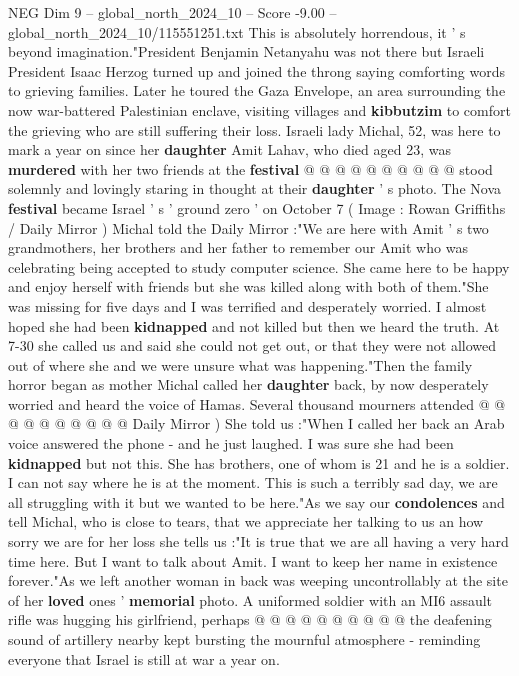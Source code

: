 \begin{textsample}{NEG Dim 9 – global\_north\_2024\_10 – Score -9.00 – global\_north\_2024\_10/115551251.txt}
This is absolutely horrendous, it ' s beyond imagination."President Benjamin Netanyahu was not there but Israeli President Isaac Herzog turned up and joined the throng saying comforting words to grieving families.
Later he toured the Gaza Envelope, an area surrounding the now war-battered Palestinian enclave, visiting villages and \textbf{kibbutzim} to comfort the grieving who are still suffering their loss.
Israeli lady Michal, 52, was here to mark a year on since her \textbf{daughter} Amit Lahav, who died aged 23, was \textbf{murdered} with her two friends at the \textbf{festival} @ @ @ @ @ @ @ @ @ @ stood solemnly and lovingly staring in thought at their \textbf{daughter} ' s photo.
The Nova \textbf{festival} became Israel ' s ' ground zero ' on October 7 ( Image : Rowan Griffiths / Daily Mirror ) Michal told the Daily Mirror :"We are here with Amit ' s two grandmothers, her brothers and her father to remember our Amit who was celebrating being accepted to study computer science.
She came here to be happy and enjoy herself with friends but she was killed along with both of them."She was missing for five days and I was terrified and desperately worried.
I almost hoped she had been \textbf{kidnapped} and not killed but then we heard the truth.
At 7-30 she called us and said she could not get out, or that they were not allowed out of where she and we were unsure what was happening."Then the family horror began as mother Michal called her \textbf{daughter} back, by now desperately worried and heard the voice of Hamas.
Several thousand mourners attended @ @ @ @ @ @ @ @ @ @ Daily Mirror ) She told us :"When I called her back an Arab voice answered the phone - and he just laughed.
I was sure she had been \textbf{kidnapped} but not this.
She has brothers, one of whom is 21 and he is a soldier.
I can not say where he is at the moment.
This is such a terribly sad day, we are all struggling with it but we wanted to be here."As we say our \textbf{condolences} and tell Michal, who is close to tears, that we appreciate her talking to us an how sorry we are for her loss she tells us :"It is true that we are all having a very hard time here.
But I want to talk about Amit.
I want to keep her name in existence forever."As we left another woman in back was weeping uncontrollably at the site of her \textbf{loved} ones ' \textbf{memorial} photo.
A uniformed soldier with an MI6 assault rifle was hugging his girlfriend, perhaps @ @ @ @ @ @ @ @ @ @ the deafening sound of artillery nearby kept bursting the mournful atmosphere - reminding everyone that Israel is still at war a year on.

\end{textsample}
